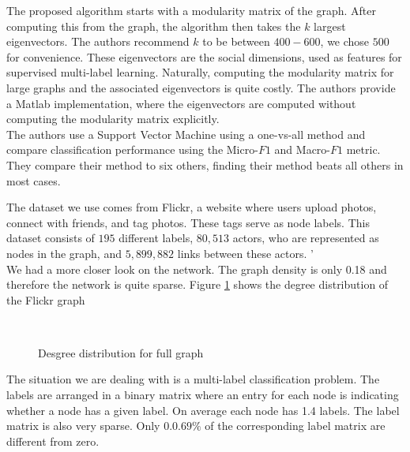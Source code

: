 \documentclass[11pt,letterpaper]{article}
\begin{document}
The proposed algorithm starts with a modularity matrix of the graph. After computing this from the graph, the algorithm then takes the $k$ largest eigenvectors. The authors recommend $k$ to be between $400-600$, we chose $500$ for convenience. These eigenvectors are the social dimensions, used as features for supervised multi-label learning. Naturally, computing the modularity matrix for large graphs and the associated eigenvectors is quite costly. The authors provide a Matlab implementation, where the eigenvectors are computed without computing the modularity matrix explicitly. \\
The authors use a Support Vector Machine using a one-vs-all method and compare classification performance using the Micro-$F1$ and Macro-$F1$ metric. They compare their method to six others, finding their method beats all others in most cases. \par

The dataset we use comes from Flickr, a website where users upload photos, connect with friends, and tag photos. These tags serve as node labels. This dataset consists of $195$ different labels, $80,513$ actors, who are represented as nodes in the graph, and $5,899,882$ links between these actors. '\\
We had a more closer look on the network. The graph density is only 0.18 and therefore the network is quite sparse. Figure \ref{fig:fig1} shows the degree distribution of the Flickr graph

\begin{figure}[H]
	 \\
	\caption{Desgree distribution for full graph}
	\label{fig:fig1}
\end{figure}

The situation we are dealing with is a multi-label classification problem. The labels are arranged in a binary matrix where an entry for each node is indicating whether a node has a given label. On average each node has 1.4 labels. The label matrix is also very sparse. Only $0. 0.69 \%$ of the corresponding label matrix are different from zero. 
\end{document}
